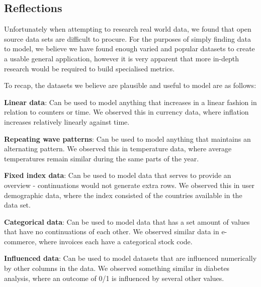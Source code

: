 \subsection{Reflections}

Unfortunately when attempting to research real world data, we found that open source data sets are difficult to procure.
For the purposes of simply finding data to model, we believe we have found enough varied and popular datasets to
create a usable general application, however it is very apparent that more in-depth research would be required to build
specialised metrics.


To recap, the datasets we believe are plausible and useful to model are as follows:

\textbf{Linear data}: Can be used to model anything that increases in a linear fashion in relation to counters or time.
We observed this in currency data, where inflation increases relatively linearly against time.

\textbf{Repeating wave patterns}: Can be used to model anything that maintains an alternating pattern.
We observed this in temperature data, where average temperatures remain similar during the same parts of the year.

\textbf{Fixed index data}: Can be used to model data that serves to provide an overview - continuations would not
generate extra rows.
We observed this in user demographic data, where the index consisted of the countries available in the data set.

\textbf{Categorical data}: Can be used to model data that has a set amount of values that have no continuations
of each other.
We observed similar data in e-commerce, where invoices each have a categorical stock code.

\textbf{Influenced data}: Can be used to model datasets that are influenced numerically by other columns in the data.
We observed something similar in diabetes analysis, where an outcome of 0/1 is influenced by several other values.